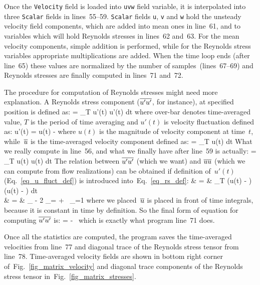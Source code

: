 Once the {\tt Velocity} field is loaded into {\tt uvw} field variable, it is
interpolated into three {\tt Scalar} fields in lines~55--59. {\tt Scalar} 
fields {\tt u}, {\tt v} and {\tt w} hold the unsteady velocity field components,
which are added into mean ones in line~61, and to variables which will hold
Reynolds stresses in lines~62 and~63. For the mean velocity components, simple 
addition is performed, while for the Reynolds stress variables appropriate 
multiplications are added. When the time loop ends (after line~65) these values 
are normalized by the number of samples~(lines~67--69) and Reynolds stresses are
finally computed in lines~71 and~72. 

The procedure for computation of Reynolds stresses might need more explanation.
A Reynolds stress component ($\overline{u'u'}$, for instance), at specified 
position is defined as:
%
\be
   =  \int_T u'(t) u'(t) dt
  \label{eq_rs_def}
\ee
%
where over-bar denotes time-averaged value, $T$ is the period of time averaging 
and $u'(t)$ is velocity fluctuation defined as: 
%
\be
  u'(t) = u(t) - 
  \label{eq_u_fluct_def}
\ee
%
where $u(t)$ is the magnitude of velocity component at time~$t$, 
while~$\overline{u}$ is the time-averaged velocity component defined as:
%
\be
   =  \int_T u(t) dt
\ee
%
What we really compute in line~56, and what we finally have after line~59 
is actually:
%
\be
   = \int_T u(t) u(t) dt
  \label{eq_UU_def}
\ee
%
The relation between $\overline{u'u'}$ (which we want) and $\overline{uu}$ 
(which we can compute from flow realizations) can be obtained if definition 
of~$u'(t)$ (Eq.~\ref{eq_u_fluct_def}) is introduced into~Eq.~\ref{eq_rs_def}:
%
\bea
  & = &  \int_T (u(t) - )(u(t) - ) dt \\ \nonumber
  & = & _{} 
      - 2  _{=} 
      +   \,  _{=1}  
\eea
% 
where we placed~$\overline{u}$ is placed in front of time integrals, because
it is constant in time by definition. So the final form of equation for
computing $\overline{u'u'}$ is:
%
\bea
   =  -  \, 
\eea
% 
which is exactly what program line~71 does. 

Once all the statistics are computed, the program saves the time-averaged
velocities from line~77 and diagonal trace of the Reynolds stress tensor
from line~78. Time-averaged velocity fields are shown in bottom right
corner of~Fig.~\ref{fig_matrix_velocity} and diagonal trace components
of the Reynolds stress tensor in~Fig.~\ref{fig_matrix_stresses}. 

